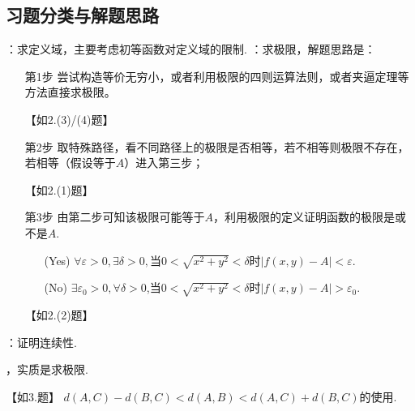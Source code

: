 \documentclass[12pt,UTF8]{ctexart}
\begin{document}
\subsection{习题分类与解题思路}
\begin{enumerate}
：求定义域，主要考虑初等函数对定义域的限制.
：求极限，解题思路是：
\begin{enumerate}
\item[第1步]尝试构造等价无穷小，或者利用极限的四则运算法则，或者夹逼定理等方法直接求极限。

【如2.(3)/(4)题】
\item[第2步]取特殊路径，看不同路径上的极限是否相等，若不相等则极限不存在，若相等（假设等于$A$）进入第三步；

【如2.(1)题】

\item[第3步]由第二步可知该极限可能等于$A$，利用极限的定义证明函数的极限是或不是$A$. 

\begin{enumerate}
\item[(Yes)]$\forall\varepsilon>0,\exists\delta>0,$当$0<\sqrt{x^2+y^2}<\delta$时$|f(x,y)-A|<\varepsilon$.
\item[(No)]$\exists\varepsilon_0>0,\forall\delta>0$,当$0<\sqrt{x^2+y^2}<\delta$时$|f(x,y)-A|>\varepsilon_0$.
\end{enumerate}

【如2.(2)题】
\end{enumerate}
：证明连续性. 
\begin{itemize}
，实质是求极限.

【如3.题】
$d(A,C)-d(B,C)<d(A,B)<d(A,C)+d(B,C)$的使用.
\end{itemize}
\end{enumerate}
\end{document}

